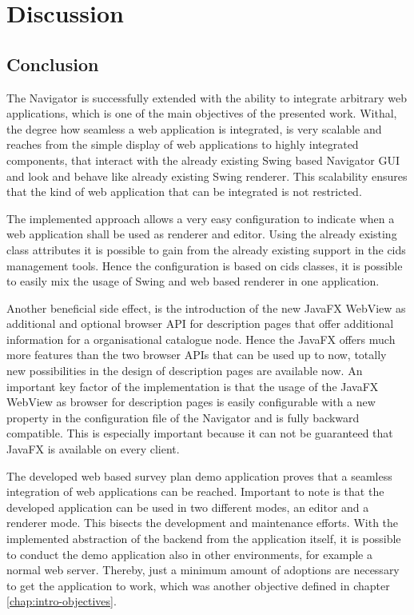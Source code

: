 \chapter{Discussion}

\section{Conclusion}

The Navigator is successfully extended with the ability to integrate arbitrary web applications, which is one of the main objectives of the presented work. 
Withal, the degree how seamless a web application is integrated, is very scalable and reaches from the simple display of web applications to highly integrated components, that interact with the already existing Swing based Navigator GUI and look and behave like already existing Swing renderer. 
This scalability ensures that the kind of web application that can be integrated is not restricted.

The implemented approach allows a very easy configuration to indicate when a web application shall be used as renderer and editor. 
Using the already existing class attributes it is possible to gain from the already existing support in the cids management tools. 
Hence the configuration is based on cids classes, it is possible to easily mix the usage of Swing and web based renderer in one application.

Another beneficial side effect, is the introduction of the new JavaFX WebView as additional and optional browser API for description pages that offer additional information for a organisational catalogue node.
Hence the JavaFX offers much more features than the two browser APIs that can be used up to now, totally new possibilities in the design of description pages are available now. 
An important key factor of the implementation is that the usage of the JavaFX WebView as browser for description pages is easily configurable with a new property in the configuration file of the Navigator and is fully backward compatible. 
This is especially important because it can not be guaranteed that JavaFX is available on every client.

The developed web based survey plan demo application proves that a seamless integration of web applications can be reached. 
Important to note is that the developed application can be used in two different modes, an editor and a renderer mode. 
This bisects the development and maintenance efforts.
With the implemented abstraction of the backend from the application itself, it is possible to conduct the demo application also in other environments, for example a normal web server. 
Thereby, just a minimum amount of adoptions are necessary to get the application to work, which was another objective defined in chapter \ref{chap:intro-objectives}.

